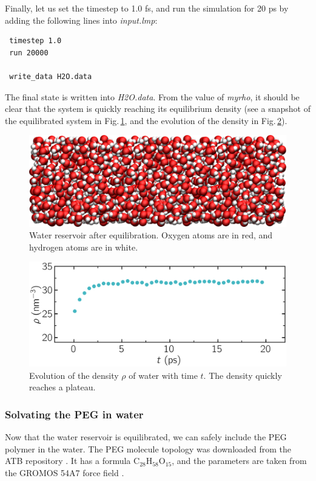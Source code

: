 \documentclass[9pt,tutorial]{livecoms}
\begin{document}
Finally, let us set the timestep to 1.0 fs, and run the simulation for 20 ps by
adding the following lines into \textit{input.lmp}:
\begin{lstlisting}
 timestep 1.0
 run 20000

 write_data H2O.data
\end{lstlisting}
The final state is written into \textit{H2O.data}. From the value of \textit{myrho},
it should be clear that the system is quickly reaching its equilibrium
density (see a snapshot of the equilibrated system in Fig.\,\ref{fig:PEG-water},
and the evolution of the density in Fig.\,\ref{fig:PEG-density}).

\begin{figure}
\centering
\includegraphics[width=\linewidth]{PEG-water}
\caption{Water reservoir after equilibration. Oxygen atoms are in red, and hydrogen
atoms are in white.}
\label{fig:PEG-water}
\end{figure}

\begin{figure}
\centering
\includegraphics[width=\linewidth]{PEG-density}
\caption{Evolution of the density $\rho$ of water with time $t$. The density
quickly reaches a plateau.}
\label{fig:PEG-density}
\end{figure}

\subsubsection{Solvating the PEG in water}
Now that the water reservoir is equilibrated, we can safely include the PEG polymer
in the water. The PEG molecule topology was downloaded from the ATB repository
\cite{malde2011automated, oostenbrink2004biomolecular}. It has a formula
$\text{C}_{28}\text{H}_{58}\text{O}_{15}$, and the parameters are taken from
the GROMOS 54A7 force field \cite{schmid2011definition}.
\end{document}
